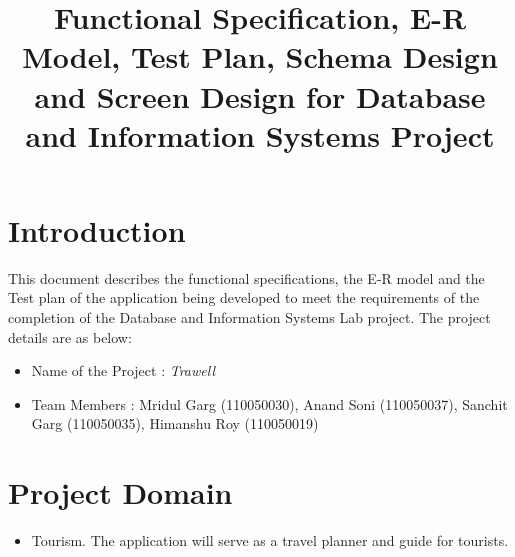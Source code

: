 \documentclass[11pt]{article}
\title{Functional Specification, E-R Model, Test Plan, Schema Design and Screen Design for Database and Information Systems Project}
\begin{document}
\maketitle
\section{Introduction}
This document describes the functional specifications, the E-R model and the Test plan of the application being developed to meet the requirements of the completion of the Database and Information Systems Lab project. The project details are as below: 
\begin{itemize}
\item Name of the Project : \emph{Trawell}
\item Team Members : Mridul Garg (110050030), Anand Soni (110050037), Sanchit Garg (110050035), Himanshu Roy (110050019) 
\end{itemize}

\section{Project Domain}
\begin{itemize}
\item Tourism. The application will serve as a travel planner and guide for tourists. 
\end{itemize}
\end{document}
